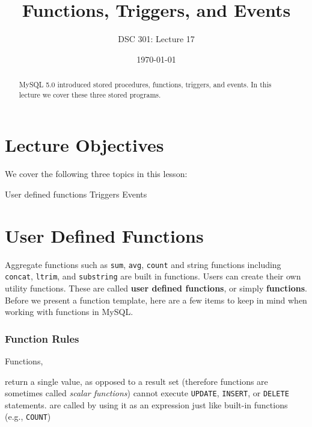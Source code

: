 \documentclass{article}
\begin{document}
\title{Functions, Triggers, and Events}
\author{DSC 301: Lecture 17}
\date{\today}
\maketitle

\begin{abstract}
\noindent MySQL 5.0 introduced stored procedures, functions, triggers, and events.  In this lecture we cover these three stored programs.  
\end{abstract}







\section*{Lecture Objectives}
We cover the following three topics in this lesson:
\begin{outline}
        \1  User defined functions
        \1  Triggers
        \1  Events        
\end{outline}










\section{User Defined Functions}
 
Aggregate functions such as \texttt{sum}, \texttt{avg}, \texttt{count} and string functions including \texttt{concat}, \texttt{ltrim}, and \texttt{substring} are built in functions.  Users can create their own utility functions.  These are called \textbf{user defined functions}, or simply \textbf{functions}.  \\

\noindent Before we present a function template, here are a few items to keep in mind when working with functions in MySQL.


\subsubsection*{Function Rules}
\noindent Functions, 
\begin{outline}
        \1  return a single value, as opposed to a result set (therefore functions are sometimes called \textit{scalar functions})
        \1   cannot execute \texttt{UPDATE}, \texttt{INSERT}, or \texttt{DELETE} statements.  
	\1  are called by using it as an expression just like built-in functions (e.g., \texttt{COUNT})
\end{outline}
\end{document}
